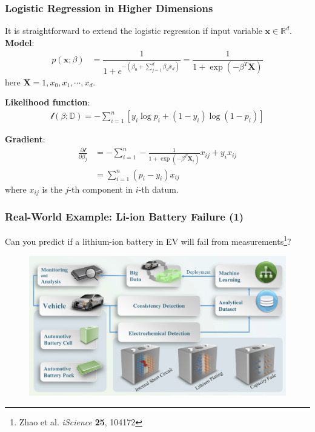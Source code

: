 \documentclass[10pt,aspectratio=169]{beamer}
\begin{document}
      \begin{frame}
        \frametitle{Logistic Regression in Higher Dimensions}

        It is straightforward to extend the logistic regression if
        input variable $\mathbf{x} \in \mathbb{R}^{d}$.  \vfill
        \textbf{Model}:
        \begin{align*}
          p(\mathbf{x}; \beta) &= \dfrac{1}{1 + e^{-(\beta_{0} + \sum_{j=1}^{d} \beta_{d} x_{d})}} = \dfrac{1}{1 + \exp(- \beta^{T} \mathbf{X})}
        \end{align*}
        here $\mathbf{X} = {1, x_{0}, x_{1}, \cdots, x_{d}}$.

        \vfill \textbf{Likelihood function}:
        \begin{align*}
          \mathscr{l}(\beta; \mathbb{D}) = -\sum_{i=1}^{n}\left[y_{i} \log p_{i} + (1 - y_{i})\log (1 - p_{i}) \right] 
        \end{align*}

        \vfill \textbf{Gradient}:
        \begin{align*}
          \frac{\partial \mathscr{l}}{\partial \beta_{j}}
          &= -\sum_{i=1}^{n} -\frac{1}{1 + \exp(-\beta^{T} \mathbf{X}_{i})} x_{ij} + y_{i}x_{ij} \\
          &= \sum_{i=1}^{n} (p_{i} - y_{i})x_{ij}
        \end{align*}
        where $x_{ij}$ is the $j$-th component in $i$-th datum.
        
      \end{frame}

      \begin{frame}
        \frametitle{Real-World Example: Li-ion Battery Failure (1)}

        Can you predict if a lithium-ion battery in EV will fail from
        measurements\let\thefootnote\relax\footnote{{\scriptsize Zhao et
            al. \textit{iScience} \textbf{25}, 104172}}?

        \begin{figure}[t]
          \includegraphics[width=0.9\linewidth]{images/battery_1.png}
        \end{figure}

      \end{frame}
\end{document}
